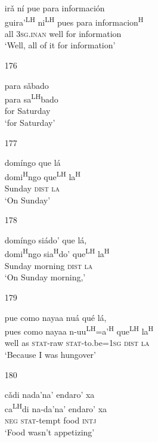 \begin{itemize}
\glll   ir\v{a} n\'{i} pue para informaci\'{o}n \\
guira'\textsuperscript{LH} ni\textsuperscript{LH} pues para informacion\textsuperscript{H} \\
all \textsc{3sg.inan} well for information\\
\glt `Well, all of it for information'
 


\item[176]
 
\glll   para s\v{a}bado \\
 para sa\textsuperscript{LH}bado\\
for Saturday\\
\glt `for Saturday'
 

\item[177]
 
\glll   dom\'{i}ngo que l\'{a}\\
 domi\textsuperscript{H}ngo que\textsuperscript{LH} la\textsuperscript{H}\\
Sunday \textsc{dist} \textsc{la}\\
\glt `On Sunday'
 

\item[178]
 
\glll   dom\'{i}ngo si\'{a}do' que l\'{a}, \\
 domi\textsuperscript{H}ngo sia\textsuperscript{H}do' que\textsuperscript{LH} la\textsuperscript{H}\\
Sunday morning \textsc{dist} \textsc{la}\\
\glt `On Sunday morning,'
 


\item[179]
 
\glll   pue como nayaa nu\'{a} qu\'{e} l\'{a},\\
pues como nayaa n-uu\textsuperscript{LH}=a'\textsuperscript{H} que\textsuperscript{LH} la\textsuperscript{H}\\
well as \textsc{stat}-raw \textsc{stat}-to.be=\textsc{1sg} \textsc{dist} \textsc{la}\\
\glt `Because I was hungover'
 


\item[180]
 
\glll   c\v{a}di nada'na' endaro' xa\\
ca\textsuperscript{LH}di na-da'na' endaro' xa \\
\textsc{neg} \textsc{stat}-tempt  food \textsc{intj}\\
\glt `Food wasn't appetizing'
 


\end{itemize}
